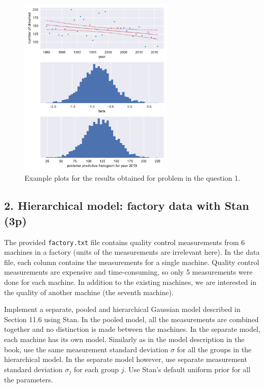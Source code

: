 \documentclass[a4paper,11pt]{article}
\begin{document}
\begin{figure}
\centering
   \includegraphics[width=0.66\textwidth]{ex7_fig1.pdf}
\caption{Example plots for the results obtained for problem in the question 1.}\label{fig1}
\end{figure}


\subsection*{2. Hierarchical model: factory data with Stan (3p)}

The provided {\tt factory.txt} file contains quality control measurements from 6 machines in a factory (units of the measurements are irrelevant here). In the data file, each column contains the measurements for a single machine. Quality control measurements are expensive and time-consuming, so only 5 measurements were done for each machine. In addition to the existing machines, we are interested in the quality of another machine (the seventh machine).

Implement a separate, pooled and hierarchical Gaussian model described in Section 11.6 using Stan. In the pooled model, all the measurements are combined together and no distinction is made between the machines. In the separate model, each machine has its own model. Similarly as in the model description in the book, use the same measurement standard deviation $\sigma$ for all the groups in the hierarchical model. In the separate model however, use separate measurement standard deviation $\sigma_j$ for each group $j$. Use Stan's default uniform prior for all the parameters.
\end{document}
